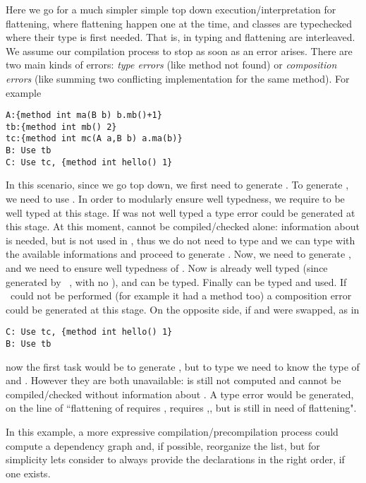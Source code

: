 Here we go for a much simpler simple top down execution/interpretation for flattening, where flattening
happen one at the time, and classes are typechecked where their type is first needed.
That is, in \name typing and flattening are interleaved. We assume our compilation process to stop as soon as 
an error arises. There are two main kinds of errors: \emph{type errors} (like method not found) or \emph{composition errors} (like summing two conflicting implementation for the same method).
For example
\saveSpace\begin{lstlisting}
A:{method int ma(B b) b.mb()+1}
tb:{method int mb() 2}
tc:{method int mc(A a,B b) a.ma(b)}
B: Use tb
C: Use tc, {method int hello() 1}
\end{lstlisting}\saveSpace
In this scenario, since we go top down, we first need to generate \Q@B@.
To generate \Q@B@, we need to use \Q@tb@.
In order to modularly ensure well typedness,
we require \Q@tb@ to be well typed at this stage. If \Q@tb@ was not well typed
a type error could be generated at this stage.
At this moment, \Q@A@ cannot be compiled/checked alone:
information about \Q@B@ is needed, but \Q@A@ is not used in \Q@tb@,
thus we do not need to type \Q@A@ and we can type \Q@tb@ with
 the available informations and proceed to generate \Q@B@.
Now, we need to generate \Q@C@, and we need to ensure well typedness of \Q@tc@.
Now \Q@B@ is already well typed (since generated by \use\ \Q@tb@, with no \mL),
and \Q@A@ can be typed. Finally \Q@tc@ can be typed and used.
If \use\ could not be performed (for example it \Q@tc@ had a method \Q@hello@ too)
a composition error could be generated at this stage.
On the opposite side, if \Q@B@ and \Q@C@ were swapped, as in
\saveSpace\begin{lstlisting}
C: Use tc, {method int hello() 1}  
B: Use tb
\end{lstlisting}\saveSpace
\noindent
now the first task would be to generate \Q@C@, but 
to type \Q@tc@ we need to know the type of \Q@A@ and \Q@B@.
However they are both unavailable: \Q@B@ is still not computed and 
\Q@A@ cannot be compiled/checked without information about \Q@B@.
A type error would be generated, on the line of ``flattening of \Q@C@
requires \Q@tc@, \Q@tc@ requires \Q@A@,\Q@B@, but \Q@B@ is still in need of flattening".

In this example, a more expressive compilation/precompilation process 
could compute a dependency graph and, if possible, reorganize the list,
but for simplicity lets consider to always provide the declarations
in the right order, if one exists.

